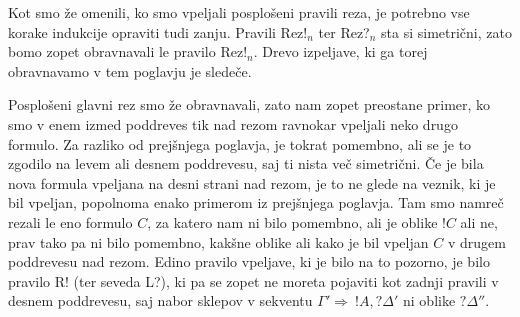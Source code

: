 Kot smo že omenili, ko smo vpeljali posplošeni pravili reza, je potrebno vse korake indukcije opraviti tudi zanju. Pravili Rez!$_n$ ter Rez?$_n$ sta si simetrični, zato bomo zopet obravnavali le pravilo Rez!$_n$. Drevo izpeljave, ki ga torej obravnavamo v tem poglavju je sledeče.
\begin{prooftree}
\end{prooftree}
Posplošeni glavni rez smo že obravnavali, zato nam zopet preostane primer, ko smo v enem izmed poddreves tik nad rezom ravnokar vpeljali neko drugo formulo. Za razliko od prejšnjega poglavja, je tokrat pomembno, ali se je to zgodilo na levem ali desnem poddrevesu, saj ti nista več simetrični. Če je bila nova formula vpeljana na desni strani nad rezom, je to ne glede na veznik, ki je bil vpeljan, popolnoma enako primerom iz prejšnjega poglavja. Tam smo namreč rezali le eno formulo $C$, za katero nam ni bilo pomembno, ali je oblike $!C$ ali ne, prav tako pa ni bilo pomembno, kakšne oblike ali kako je bil vpeljan $C$ v drugem poddrevesu nad rezom. Edino pravilo vpeljave, ki je bilo na to pozorno, je bilo pravilo R! (ter seveda L?), ki pa se zopet ne moreta pojaviti kot zadnji pravili v desnem poddrevesu, saj nabor sklepov v sekventu $\Gamma' \Rightarrow \ !A,?\Delta'$ ni oblike $?\Delta''$.

